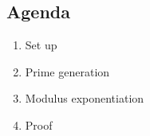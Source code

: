 

\subsection{Agenda}
\begin{enumerate}
\item Set up
\item Prime generation
\item Modulus exponentiation
\item Proof
\end{enumerate}


